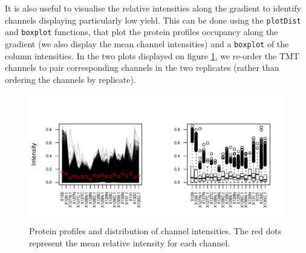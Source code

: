 It is also useful to visualise the relative intensities along the
gradient to identify channels displaying particularly low yield. This
can be done using the \texttt{plotDist} and \texttt{boxplot}
functions, that plot the protein profiles occupancy along the gradient
(we also display the mean channel intensities) and a \texttt{boxplot}
of the column intensities.  In the two plots displayed on figure
\ref{fig:qcbx}, we re-order the TMT channels to pair corresponding
channels in the two replicates (rather than ordering the channels by
replicate).

\begin{figure}[!ht]
  \centering
\begin{knitrout}
\color{fgcolor}\begin{kframe}
\begin{alltt}
\hlstd{(} \hlstd{=} \hlstd{(}\hlstd{,} \hlstd{),} 
     \hlstd{=} \hlstd{,}         
     \hlstd{=} \hlstd{)}   
 \hlkwb{<-} \hlopt{$}
  \hlstd{=} \hlstd{,}  \hlstd{=} \hlstd{)}
\hlstd{(}\hlstd{(}  \hlstd{=} \hlstd{,}  \hlstd{=} \hlstd{)}
\hlstd{(}
\end{alltt}
\end{kframe}
\includegraphics[width=\textwidth]{figure/qcbx-1} 

\end{knitrout}
\caption{Protein profiles and distribution of channel intensities. The
  red dots represent the mean relative intensity for each channel. }
  \label{fig:qcbx}
\end{figure}

